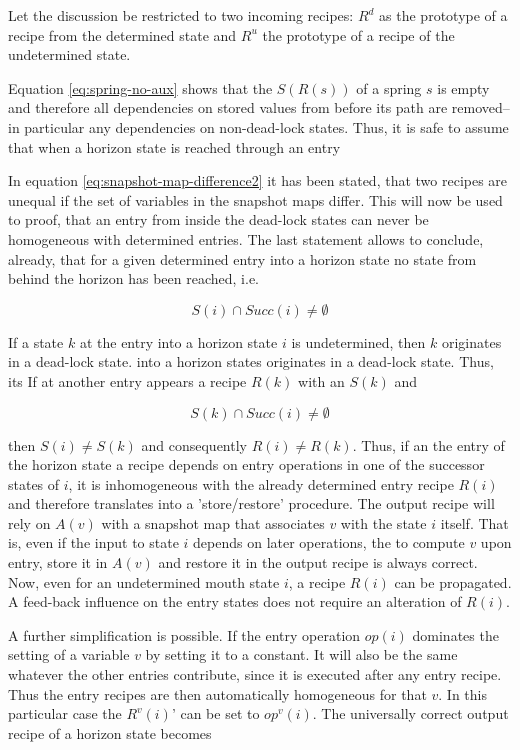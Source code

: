 \documentclass[12pt,a4paper]{scrartcl}
\begin{document}
Let the discussion be restricted to two incoming recipes: $R^d$ as the
prototype of a recipe from the determined state and $R^u$ the prototype of a
recipe of the undetermined state.  

Equation \eqref{eq:spring-no-aux} shows that the $S(R(s))$ of a spring $s$ is
empty and therefore all dependencies on stored values from before its path are
removed--in particular any dependencies on non-dead-lock states. Thus, it is
safe to assume that when a horizon state is reached through an entry
   
In equation \eqref{eq:snapshot-map-difference2} it has been stated, that two
recipes are unequal if the set of variables in the snapshot maps differ.  This
will now be used to proof, that an entry from inside the dead-lock states can
never be homogeneous with determined entries.  The last statement allows to
conclude, already, that for a given determined entry into a horizon state no
state from behind the horizon has been reached, i.e.

\begin{equation}
    S(i) \cap Succ(i) \neq \emptyset
\end{equation}

If a state $k$ at the entry into a horizon state $i$ is undetermined, then
$k$ originates in a dead-lock state. into a horizon states originates in a dead-lock state. 
Thus, its If at another entry appears a recipe $R(k)$ with an $S(k)$ and 

\begin{equation}
              S(k) \cap Succ(i) \neq \emptyset
\end{equation}

then \(S(i) \neq S(k)\) and consequently \(R(i) \neq R(k)\). Thus, if an the entry of
the horizon state a recipe depends on entry operations in one of the successor
states of $i$, it is inhomogeneous with the already determined entry recipe
$R(i)$ and therefore translates into a 'store/restore' procedure. The output
recipe will rely on $A(v)$ with a snapshot map that associates $v$ with the
state $i$ itself. That is, even if the input to state $i$ depends on later
operations, the to compute $v$ upon entry, store it in $A(v)$ and restore it in
the output recipe is always correct. Now, even for an undetermined mouth state
$i$, a recipe $R(i)$ can be propagated.  A feed-back influence on the entry
states does not require an alteration of $R(i)$.

A further simplification is possible. If the entry operation $op(i)$ dominates
the setting of a variable $v$ by setting it to a constant.  It will also be the
same whatever the other entries contribute, since it is executed after any
entry recipe. Thus the entry recipes are then automatically homogeneous for
that $v$. In this particular case the $R^v(i)$' can be set to $op^v(i)$.  The
universally correct output recipe of a horizon state becomes 
\end{document}
